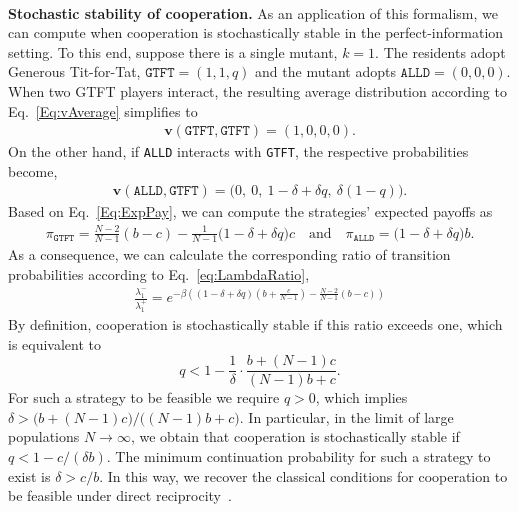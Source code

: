 \documentclass[11pt]{article}
\def\alld{\texttt{ALLD}}
\def\gtft{\texttt{GTFT}}
\theoremstyle{plainCl1}
\theoremstyle{plainCl2}
\begin{document}
~\\
{\bf Stochastic stability of cooperation.}
As an application of this formalism, we can compute when cooperation is stochastically stable in the perfect-information setting. 
To this end, suppose there is a single mutant, $k\!=\!1$. The residents adopt Generous Tit-for-Tat, $\gtft = (1, 1, q)$ and the mutant adopts $\alld\! = \! (0,0,0)$. When two GTFT players interact, the resulting average distribution according to Eq.~\eqref{Eq:vAverage} simplifies to
\begin{align*}
\mathbf{v}(\gtft,\gtft) = (1, 0, 0, 0).
\end{align*}
On the other hand, if \alld{} interacts with \gtft, the respective probabilities become,
\begin{align*}
  \mathbf{v}(\alld,\gtft) = \big(0,~0,~1\!-\!\delta\!+\!\delta q,~\delta(1\! -\! q)\big).
\end{align*}
Based on Eq.~\eqref{Eq:ExpPay}, we can compute the strategies' expected payoffs as
\begin{align*}
\pi_\gtft =  \frac{N\!-\!2}{N-1} (b - c)  \!-\! \frac{1}{N-1}\big(1\!-\!\delta\!+\!\delta q\big)c
\quad \text{and} \quad
\pi_\alld  = \big(1\!-\!\delta\!+\!\delta q\big)b.
\end{align*}
As a consequence, we can calculate the corresponding ratio of transition probabilities according to Eq.~\eqref{eq:LambdaRatio},
\begin{align*}
\frac{\lambda_1^{-}}{\lambda_1^{+}} = e^{-\beta \left( (1-\delta+\delta q)(b+\frac{c}{N-1})- \frac{N-2}{N-1}(b-c) \right)}
\end{align*}
By definition, cooperation is stochastically stable if this ratio exceeds one, which is equivalent to
\begin{equation}\label{Eq:Condition_PerfectMemory}
q<1-\frac{1}{\delta}\cdot \frac{b+(N\!-\!1)c}{(N\!-\!1)b+c}.
\end{equation}
For such a strategy to be feasible we require $q\!>\!0$, which implies $\delta \!>\! \big(b+(N\!-\!1)c\big)/\big((N\!-\!1)b\!+\!c\big)$.
In particular, in the limit of large populations \(N \!\rightarrow\! \infty\), we obtain that cooperation is stochastically stable if  \(q \!<\! 1\! -\! c/(\delta b)\). 
The minimum continuation probability for such a strategy to exist is $\delta \!>\! c/b$. 
In this way, we recover the classical conditions for cooperation to be feasible under direct reciprocity~\citep{molander:jcr:1985,Nowak1992tit,Schmid:NHB:2021}.
\end{document}
